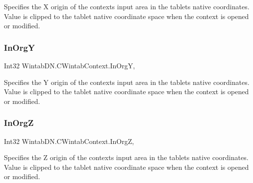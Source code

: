 Specifies the X origin of the context\textquotesingle{}s input area in the tablet\textquotesingle{}s native coordinates. Value is clipped to the tablet native coordinate space when the context is opened or modified. 

\mbox{\label{class_wintab_d_n_1_1_c_wintab_context_a0f480b34eb30bf42edd2adf565572ae3}} 
\subsubsection{\texorpdfstring{In\+OrgY}{InOrgY}}
{\footnotesize\ttfamily Int32 Wintab\+D\+N.\+C\+Wintab\+Context.\+In\+OrgY\hspace{0.3cm}{\ttfamily [get]}, {\ttfamily [set]}}



Specifies the Y origin of the context\textquotesingle{}s input area in the tablet\textquotesingle{}s native coordinates. Value is clipped to the tablet native coordinate space when the context is opened or modified. 

\mbox{\label{class_wintab_d_n_1_1_c_wintab_context_afe123e2d48ea3c171c2b040dd512cda6}} 
\subsubsection{\texorpdfstring{In\+OrgZ}{InOrgZ}}
{\footnotesize\ttfamily Int32 Wintab\+D\+N.\+C\+Wintab\+Context.\+In\+OrgZ\hspace{0.3cm}{\ttfamily [get]}, {\ttfamily [set]}}



Specifies the Z origin of the context\textquotesingle{}s input area in the tablet\textquotesingle{}s native coordinates. Value is clipped to the tablet native coordinate space when the context is opened or modified. 

\mbox{\label{class_wintab_d_n_1_1_c_wintab_context_ab05bc9afc19654c5495adfb60efdc06d}} 

